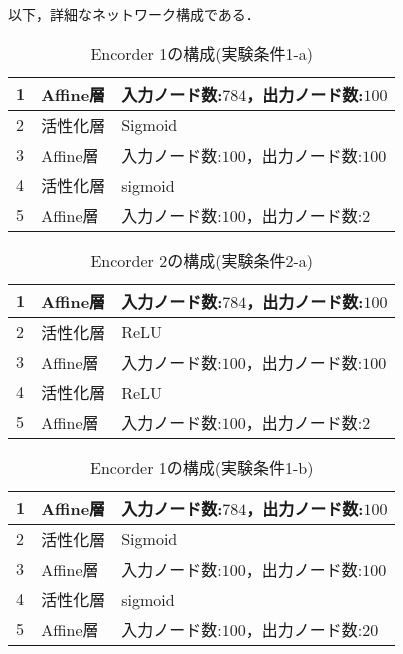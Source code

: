 \documentclass[12pt]{jsarticle}
\begin{document}
以下，詳細なネットワーク構成である．

\begin{table}[hbt]
\begin{center}
\caption{Encorder 1の構成(実験条件1-a)}
\label{table:Encorder1}
\begin{tabularx}{0.9\linewidth}{|l|l|X|}
\hline
1 & Affine層 & 入力ノード数:$784$，出力ノード数:$100$ \\
\hline
2 & 活性化層 & Sigmoid \\
\hline
3 & Affine層 & 入力ノード数:$100$，出力ノード数:$100$ \\
\hline
4 & 活性化層 & sigmoid　\\
\hline
5 & Affine層 & 入力ノード数:$100$，出力ノード数:$2$ \\
\hline
\end{tabularx}
\end{center}
\end{table}


\begin{table}[hbt]
\begin{center}
\caption{Encorder 2の構成(実験条件2-a)}
\label{table:Encorder1}
\begin{tabularx}{0.9\linewidth}{|l|l|X|}
\hline
1 & Affine層 & 入力ノード数:$784$，出力ノード数:$100$ \\
\hline
2 & 活性化層 & ReLU \\
\hline
3 & Affine層 & 入力ノード数:$100$，出力ノード数:$100$ \\
\hline
4 & 活性化層 & ReLU　\\
\hline
5 & Affine層 & 入力ノード数:$100$，出力ノード数:$2$ \\
\hline
\end{tabularx}
\end{center}
\end{table}

\begin{table}[hbt]
\begin{center}
\caption{Encorder 1の構成(実験条件1-b)}
\label{table:Encorder1}
\begin{tabularx}{0.9\linewidth}{|l|l|X|}
\hline
1 & Affine層 & 入力ノード数:$784$，出力ノード数:$100$ \\
\hline
2 & 活性化層 & Sigmoid \\
\hline
3 & Affine層 & 入力ノード数:$100$，出力ノード数:$100$ \\
\hline
4 & 活性化層 & sigmoid　\\
\hline
5 & Affine層 & 入力ノード数:$100$，出力ノード数:$20$ \\
\hline
\end{tabularx}
\end{center}
\end{table}
\end{document}
